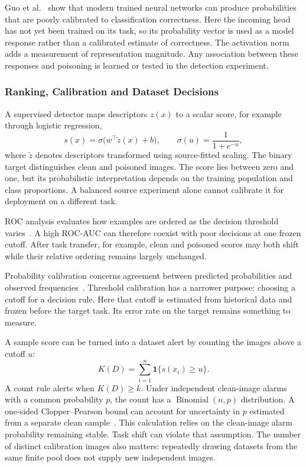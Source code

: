 Guo et al.~\cite{guo2017calibration} show that modern trained neural networks
can produce probabilities that are poorly calibrated to classification
correctness. Here the incoming head has not yet been trained on its task,
so its probability vector is used as a model response rather than a
calibrated estimate of correctness. The activation norm adds a measurement
of representation magnitude. Any association between these responses and
poisoning is learned or tested in the detection experiment.

\subsubsection{Ranking, Calibration and Dataset Decisions}

A supervised detector maps descriptors $z(x)$ to a scalar score, for
example through logistic regression,
\begin{equation}
 s(x)=\sigma\bigl(w^\top\widetilde z(x)+b\bigr),\qquad
 \sigma(u)=\frac{1}{1+e^{-u}},
 \label{eq:bg-logistic-score}
\end{equation}
where $\widetilde z$ denotes descriptors transformed using source-fitted
scaling. The binary target distinguishes clean and poisoned images. The
score lies between zero and one, but its probabilistic interpretation depends
on the training population and class proportions. A balanced source
experiment alone cannot calibrate it for deployment on a different task.

ROC analysis evaluates how examples are ordered as the decision threshold
varies~\cite{fawcett2006roc}. A high ROC-AUC can therefore coexist with
poor decisions at one frozen cutoff. After task transfer, for example, clean
and poisoned scores may both shift while their relative ordering remains
largely unchanged.

Probability calibration concerns agreement between predicted probabilities
and observed frequencies~\cite{guo2017calibration}. Threshold calibration
has a narrower purpose: choosing a cutoff for a decision rule. Here that
cutoff is estimated from historical data and frozen before the target task.
Its error rate on the target remains something to measure.

A sample score can be turned into a dataset alert by counting the images
above a cutoff $u$:
\begin{equation}
 K(D)=\sum_{i=1}^{n}\mathbf{1}\{s(x_i)\geq u\}.
 \label{eq:bg-dataset-count}
\end{equation}
A count rule alerts when $K(D)\geq k$. Under independent clean-image
alarms with a common probability $p$, the count has a
$\operatorname{Binomial}(n,p)$ distribution. A one-sided Clopper--Pearson
bound can account for uncertainty in $p$ estimated from a separate clean
sample~\cite{clopper1934binomial}. This calculation relies on the clean-image
alarm probability remaining stable. Task shift can violate that assumption.
The number of distinct calibration images also matters: repeatedly drawing
datasets from the same finite pool does not supply new independent images.

